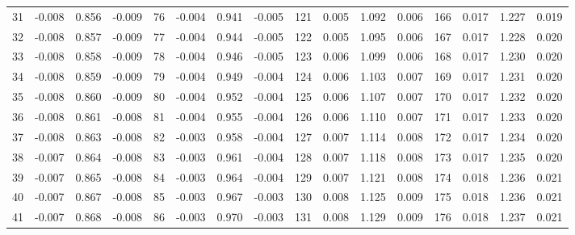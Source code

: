 \begin{table}
{\begin{tabular}{rrrr|rrrr|rrrr|crrr}
 31 & \tiny{ -0.008} &   0.856 & \tiny{ -0.009} &  76 & \tiny{ -0.004} &   0.941 & \tiny{ -0.005} & 121 & \tiny{  0.005} &   1.092 & \tiny{  0.006} & 166 & \tiny{  0.017} &   1.227 & \tiny{  0.019}\\
 32 & \tiny{ -0.008} &   0.857 & \tiny{ -0.009} &  77 & \tiny{ -0.004} &   0.944 & \tiny{ -0.005} & 122 & \tiny{  0.005} &   1.095 & \tiny{  0.006} & 167 & \tiny{  0.017} &   1.228 & \tiny{  0.020}\\
 33 & \tiny{ -0.008} &   0.858 & \tiny{ -0.009} &  78 & \tiny{ -0.004} &   0.946 & \tiny{ -0.005} & 123 & \tiny{  0.006} &   1.099 & \tiny{  0.006} & 168 & \tiny{  0.017} &   1.230 & \tiny{  0.020}\\
 34 & \tiny{ -0.008} &   0.859 & \tiny{ -0.009} &  79 & \tiny{ -0.004} &   0.949 & \tiny{ -0.004} & 124 & \tiny{  0.006} &   1.103 & \tiny{  0.007} & 169 & \tiny{  0.017} &   1.231 & \tiny{  0.020}\\
 35 & \tiny{ -0.008} &   0.860 & \tiny{ -0.009} &  80 & \tiny{ -0.004} &   0.952 & \tiny{ -0.004} & 125 & \tiny{  0.006} &   1.107 & \tiny{  0.007} & 170 & \tiny{  0.017} &   1.232 & \tiny{  0.020}\\
 36 & \tiny{ -0.008} &   0.861 & \tiny{ -0.008} &  81 & \tiny{ -0.004} &   0.955 & \tiny{ -0.004} & 126 & \tiny{  0.006} &   1.110 & \tiny{  0.007} & 171 & \tiny{  0.017} &   1.233 & \tiny{  0.020}\\
 37 & \tiny{ -0.008} &   0.863 & \tiny{ -0.008} &  82 & \tiny{ -0.003} &   0.958 & \tiny{ -0.004} & 127 & \tiny{  0.007} &   1.114 & \tiny{  0.008} & 172 & \tiny{  0.017} &   1.234 & \tiny{  0.020}\\
 38 & \tiny{ -0.007} &   0.864 & \tiny{ -0.008} &  83 & \tiny{ -0.003} &   0.961 & \tiny{ -0.004} & 128 & \tiny{  0.007} &   1.118 & \tiny{  0.008} & 173 & \tiny{  0.017} &   1.235 & \tiny{  0.020}\\
 39 & \tiny{ -0.007} &   0.865 & \tiny{ -0.008} &  84 & \tiny{ -0.003} &   0.964 & \tiny{ -0.004} & 129 & \tiny{  0.007} &   1.121 & \tiny{  0.008} & 174 & \tiny{  0.018} &   1.236 & \tiny{  0.021}\\
 40 & \tiny{ -0.007} &   0.867 & \tiny{ -0.008} &  85 & \tiny{ -0.003} &   0.967 & \tiny{ -0.003} & 130 & \tiny{  0.008} &   1.125 & \tiny{  0.009} & 175 & \tiny{  0.018} &   1.236 & \tiny{  0.021}\\
 41 & \tiny{ -0.007} &   0.868 & \tiny{ -0.008} &  86 & \tiny{ -0.003} &   0.970 & \tiny{ -0.003} & 131 & \tiny{  0.008} &   1.129 & \tiny{  0.009} & 176 & \tiny{  0.018} &   1.237 & \tiny{  0.021}\\

\end{tabular}}
\end{table}

